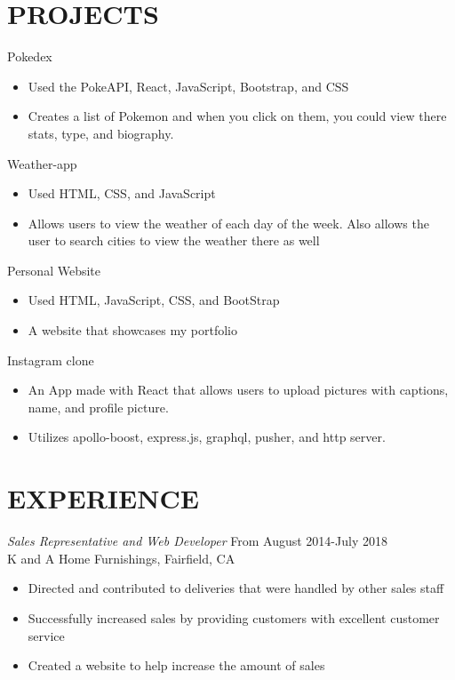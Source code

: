 \documentclass[margin]{res}
\begin{document}
\begin{resume}
\section{PROJECTS}     
	Pokedex
 		\begin{itemize} \itemsep -2pt 
 		\item Used the PokeAPI, React, JavaScript, Bootstrap, and CSS
 		\item Creates a list of Pokemon and when you click on them, you could view there stats, type, and biography. 
 		\end{itemize}        
 	Weather-app
 		\begin{itemize} \itemsep -2pt 
 		\item Used HTML, CSS, and JavaScript
 		\item Allows users to view the weather of each day of the week. Also allows the user to search cities to view the weather there as well
 		\end{itemize}
 		Personal Website
 		\begin{itemize} \itemsep -2pt 
 		\item Used HTML, JavaScript, CSS, and BootStrap
 		\item A website that showcases my portfolio 
 		\end{itemize}
 	Instagram\- clone
 		\begin{itemize} \itemsep -2pt 
 		\item An App made with React that allows users to upload pictures with captions, name, and profile picture. 	
 		\item Utilizes apollo-boost, express.js, graphql, pusher, and http server.
 		
 		\end{itemize}
 		
\section{EXPERIENCE} {\sl Sales Representative and Web Developer} \hfill From August 2014-July 2018 \\ 
                K and A Home Furnishings, Fairfield, CA 
                 \begin{itemize}  \itemsep -2pt 
                 \item  Directed and contributed to deliveries that were handled by other sales staff
                \item   Successfully increased sales by providing customers with excellent customer service  
                \item Created a website to help increase the amount of sales 
                \end{itemize}

\end{resume}
\end{document}
